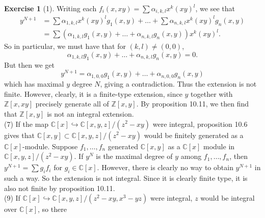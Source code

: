 \documentclass[reqno]{amsart}
\theoremstyle{definition}
\newtheorem{exercise}[theorem]{Exercise}
\theoremstyle{remark}
\begin{document}
\begin{exercise}[1]
     Writing each
     $f_i (x,xy) =
     \sum \alpha_{i, k,l}
     x^{k} \left( xy \right)^{l}$, we see that
     \begin{align*}
         y^{N+1} &
         =
     \sum \alpha_{1,k,l} x^{k} (xy)^{l} g_1(x,y)
     + \ldots +
     \sum \alpha_{n,k,l} x^{k}(xy)^{l} g_n(x,y)\\
     &= \sum \left( \alpha_{1,k,l}g_1(x,y) +
     \ldots + \alpha_{n,k,l}g_n(x,y) \right)
     x^{k} (xy)^{l}.
     \end{align*}
     So in particular, we must have
     that
     for $\left( k,l \right) \neq (0,0)$,
     \[
     \alpha_{1,k,l}g_1(x,y) + \ldots+
     \alpha_{n,k,l}g_n(x,y) = 0.
     \]
     But then we get
     \[
     y^{N+1} =
     \alpha_{1,0,0} g_1(x,y) +\ldots
     + \alpha_{n,0,0}g_n(x,y)
     \]
     which has  maximal $y$ degree $N$, giving a contradiction.
     Thus the extension is not finite.
     However,
     clearly, it is a finite-type extension, since
     $y$ together with
     $\mathbb{Z}\left[ x,xy \right] $ precisely generate all
     of $\mathbb{Z}\left[ x,y \right] $.
     By proposition 10.11, we then
     find that $\mathbb{Z}\left[ x,y \right] $ is not an
     integral extension.\\
     \linebreak
     (7) If the map
     $\mathbb{C}\left[ x \right]
     \hookrightarrow
     \mathbb{C}\left[ x,y,z \right] / \left( z^2
     -xy\right) $ were integral, proposition 10.6 gives that
     $\mathbb{C}\left[ x,y \right]
     \subset \mathbb{C}\left[ x,y,z \right]
     / \left( z^2 - xy \right)$ would be
     finitely generated as a
      $\mathbb{C}\left[ x \right] $-module.
      Suppose
      $f_1, \ldots, f_n$ generated
      $\mathbb{C}\left[ x,y \right] $ as
      a $\mathbb{C}\left[ x \right] $ module in
      $\mathbb{C}\left[ x,y,z \right] /
      \left( z^2 - xy \right) $.
      If $y^{N}$ is the maximal degree of $y$ among
      $f_1, \ldots, f_n$, then
      $y^{N+1} = \sum g_i f_i$ for
      $g_i \in \mathbb{C}\left[ x \right] $.
      However, there is clearly no way to obtain
      $y^{N+1}$ in such a way. So
      the extension is not integral. Since it is
      clearly finite type, it is also not finite by proposition
      10.11.\\
      \linebreak
      (9) If
      $\mathbb{C}[x]
      \hookrightarrow
      \mathbb{C}\left[ x,y,z \right] /
      \left( z^2 - xy, x^3 - yz \right) $ were
      integral, $z$ would be integral over
      $\mathbb{C}\left[ x \right] $, so there

\end{exercise}
\end{document}
